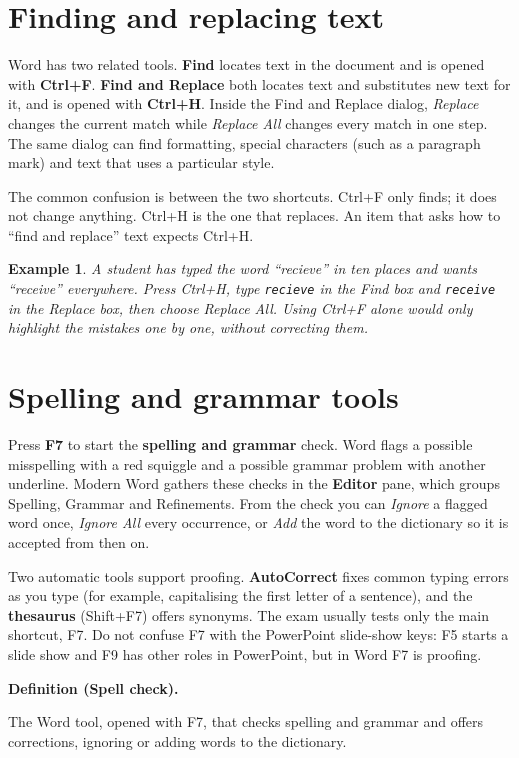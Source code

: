 \documentclass[11pt]{article}
\newtheorem{example}{Example}[section]
\newenvironment{definitionbox}[1]{%
  \par\noindent\textbf{Definition (#1).}\ \itshape
}{\par\vspace{0.3em}}
\begin{document}
\section{Finding and replacing text}
Word has two related tools. \textbf{Find} locates text in the document and is
opened with \textbf{Ctrl+F}. \textbf{Find and Replace} both locates text and
substitutes new text for it, and is opened with \textbf{Ctrl+H}. Inside the
Find and Replace dialog, \emph{Replace} changes the current match while
\emph{Replace All} changes every match in one step. The same dialog can find
formatting, special characters (such as a paragraph mark) and text that uses a
particular style.

The common confusion is between the two shortcuts. Ctrl+F only finds; it does
not change anything. Ctrl+H is the one that replaces. An item that asks how to
``find and replace'' text expects Ctrl+H.

\begin{example}
A student has typed the word ``recieve'' in ten places and wants ``receive''
everywhere. Press Ctrl+H, type \texttt{recieve} in the Find box and
\texttt{receive} in the Replace box, then choose Replace All. Using Ctrl+F
alone would only highlight the mistakes one by one, without correcting them.
\end{example}

\section{Spelling and grammar tools}
Press \textbf{F7} to start the \textbf{spelling and grammar} check. Word
flags a possible misspelling with a red squiggle and a possible grammar problem
with another underline. Modern Word gathers these checks in the
\textbf{Editor} pane, which groups Spelling, Grammar and Refinements. From the
check you can \emph{Ignore} a flagged word once, \emph{Ignore All} every
occurrence, or \emph{Add} the word to the dictionary so it is accepted from
then on.

Two automatic tools support proofing. \textbf{AutoCorrect} fixes common typing
errors as you type (for example, capitalising the first letter of a sentence),
and the \textbf{thesaurus} (Shift+F7) offers synonyms. The exam usually tests
only the main shortcut, F7. Do not confuse F7 with the PowerPoint slide-show
keys: F5 starts a slide show and F9 has other roles in PowerPoint, but in Word
F7 is proofing.

\begin{definitionbox}{Spell check}
The Word tool, opened with F7, that checks spelling and grammar and offers
corrections, ignoring or adding words to the dictionary.
\end{definitionbox}
\end{document}

